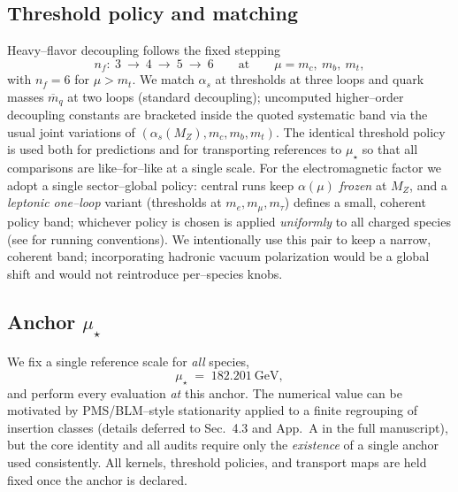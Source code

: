 \documentclass[epjc3]{svjour3}
\begin{document}
\subsection{Threshold policy and matching}
\label{sec:thresholds}
Heavy–flavor decoupling follows the fixed stepping
\begin{equation}
  n_f:\ 3\ \longrightarrow\ 4\ \longrightarrow\ 5\ \longrightarrow\ 6
  \qquad\text{at}\qquad \mu=m_c,\ m_b,\ m_t,
\end{equation}
with $n_f=6$ for $\mu>m_t$. We match $\alpha_s$ at thresholds at three loops and quark masses $\overline m_q$ at two loops (standard decoupling); uncomputed higher–order decoupling constants are bracketed inside the quoted systematic band via the usual joint variations of $(\alpha_s(M_Z),m_c,m_b,m_t)$. The identical threshold policy is used both for predictions and for transporting references to $\mu_\star$ so that all comparisons are like–for–like at a single scale. For the electromagnetic factor we adopt a single sector–global policy: central runs keep $\alpha(\mu)$ \emph{frozen} at $M_Z$, and a \emph{leptonic one–loop} variant (thresholds at $m_e,m_\mu,m_\tau$) defines a small, coherent policy band; whichever policy is chosen is applied \emph{uniformly} to all charged species (see \cite{PDG2023} for running conventions). We intentionally use this pair to keep a narrow, coherent band; incorporating hadronic vacuum polarization would be a global shift and would not reintroduce per–species knobs.

\subsection{Anchor $\mu_\star$}
\label{sec:anchor}
We fix a single reference scale for \emph{all} species,
\begin{equation}
  \mu_\star\;=\;182.201~\mathrm{GeV},
\end{equation}
and perform every evaluation \emph{at} this anchor. The numerical value can be motivated by PMS/BLM–style stationarity applied to a finite regrouping of insertion classes (details deferred to Sec.~4.3 and App.~A in the full manuscript), but the core identity and all audits require only the \emph{existence} of a single anchor used consistently. All kernels, threshold policies, and transport maps are held fixed once the anchor is declared.
\end{document}

